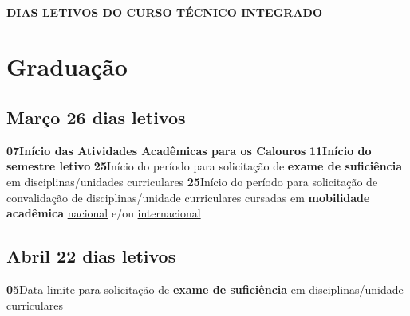 \documentclass[thesis]{hmcposter}
\begin{document}
\begin{poster}
\vfill
\null
\columnbreak
~
\vfill
\begin{center}
\large \textbf{DIAS LETIVOS DO CURSO TÉCNICO INTEGRADO}
\newline
\null
\newline
\begin{table}
\centering
{}
\end{table}
\newline
\null
\newline
\end{center}
\vfill
\null
\newpage\section{\color{hmcorange}Graduação}\subsection{Março \hfill 26 dias letivos}\textbf{07}\qquad \textbf{Início das Atividades Acadêmicas para os Calouros} \newline \null\textbf{11}\qquad \textbf{Início do semestre letivo} \newline \null\textbf{25}\qquad Início do período para solicitação de \textbf{exame de suficiência} em disciplinas/unidades curriculares \newline \null\textbf{25}\qquad Início do período para solicitação de convalidação de disciplinas/unidade curriculares cursadas em \textbf{mobilidade acadêmica} \underline{nacional} e/ou \underline{internacional} \newline \null\subsection{Abril \hfill 22 dias letivos}\textbf{05}\qquad Data limite para solicitação de \textbf{exame de suficiência} em disciplinas/unidade curriculares \newline \null\vfill\null
\columnbreak

\end{poster}
\end{document}
